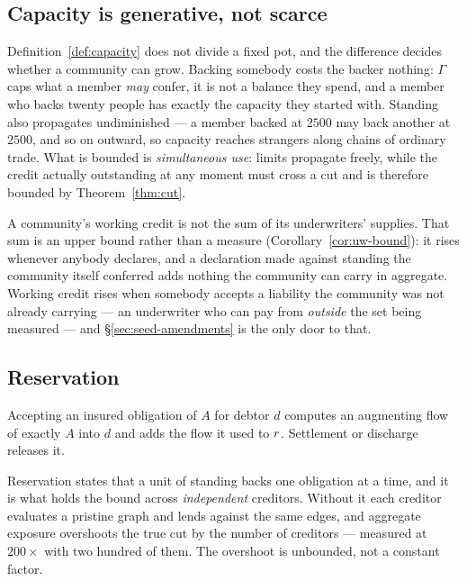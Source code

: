\subsection{Capacity is generative, not scarce}

Definition~\ref{def:capacity} does not divide a fixed pot, and the difference decides
whether a community can grow. Backing somebody costs the backer nothing: $\Gamma$ caps
what a member \emph{may} confer, it is not a balance they spend, and a member who backs
twenty people has exactly the capacity they started with. Standing also propagates
undiminished --- a member backed at $2500$ may back another at $2500$, and so on outward,
so capacity reaches strangers along chains of ordinary trade. What is bounded is
\emph{simultaneous use}: limits propagate freely, while the credit actually outstanding
at any moment must cross a cut and is therefore bounded by Theorem~\ref{thm:cut}.

A community's working credit is not the sum of its underwriters' supplies. That sum is an
upper bound rather than a measure (Corollary~\ref{cor:uw-bound}): it rises whenever
anybody declares, and a declaration made against standing the community itself conferred
adds nothing the community can carry in aggregate. Working credit rises when somebody
accepts a liability the community was not already carrying --- an underwriter who can pay
from \emph{outside} the set being measured --- and \S\ref{sec:seed-amendments} is the only
door to that.

\subsection{Reservation}

\begin{definition}[Reservation]
\label{def:reservation}
Accepting an insured obligation of $A$ for debtor $d$ computes an augmenting flow of
exactly $A$ into $d$ and adds the flow it used to $r$. Settlement or discharge
releases it.
\end{definition}

Reservation states that a unit of standing backs one obligation at a time, and it is what
holds the bound across \emph{independent} creditors. Without it each creditor evaluates a
pristine graph and lends against the same edges, and aggregate exposure overshoots the
true cut by the number of creditors --- measured at $200\times$ with two hundred of them.
The overshoot is unbounded, not a constant factor.


